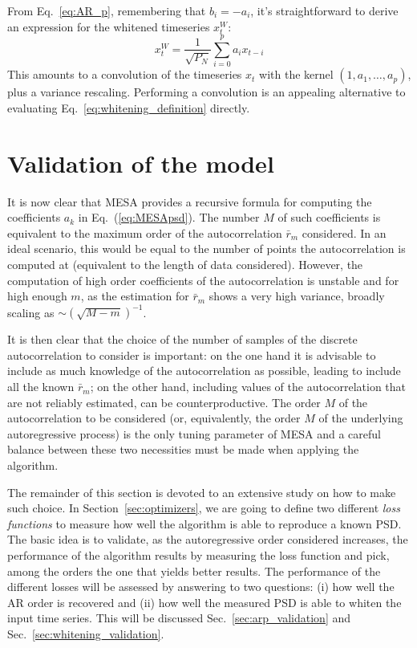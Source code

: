 \documentclass{aa}
\begin{document}
From Eq.~\eqref{eq:AR_p}, remembering that $b_i = - a_i$, it's straightforward to derive an expression for the whitened timeseries $x^W_t$:
\begin{equation}
	x^W_t = \frac{1}{\sqrt{P_N}} \sum_{i=0}^p a_i x_{t-i}
\end{equation}
This amounts to a convolution of the timeseries  $x_t$ with the kernel $(1, a_1, \hdots, a_p)$, plus a variance rescaling.
Performing a convolution is an appealing alternative to evaluating Eq.~\eqref{eq:whitening_definition} directly.

\section{Validation of the model}\label{sec:validation}
It is now clear that MESA provides a recursive formula for computing the coefficients $a_k$ in Eq.~(\ref{eq:MESApsd}). The number $M$ of such coefficients is equivalent to the maximum order of the autocorrelation $\bar{r}_m$ considered. In an ideal scenario, this would be equal to the number of points the autocorrelation is computed at (equivalent to the length of data considered). However, the computation of high order coefficients of the autocorrelation is unstable and for high enough $m$, as the estimation for  $\bar{r}_m$ shows a very high variance, broadly scaling as $\sim \left(\sqrt{M - m}\right)^{-1}$.

It is then clear that the choice of the number of samples of the discrete autocorrelation to consider is important: 
on the one hand it is advisable to include as much knowledge of the autocorrelation as possible, leading to include all the known $\bar{r}_m$; on the other hand, including values of the autocorrelation that are not reliably estimated, can be counterproductive.
The order $M$ of the autocorrelation to be considered (or, equivalently, the order $M$ of the underlying autoregressive process) is the only tuning parameter of MESA and a careful balance between these two necessities must be made when applying the algorithm.

The remainder of this section is devoted to an extensive study on how to make such choice.
In Section~\ref{sec:optimizers}, we are going to define two different \textit{loss functions} to measure how well the 
algorithm is able to reproduce a known PSD.
The basic idea is to validate, as the autoregressive order considered increases, the performance of the algorithm results 
by measuring the loss function and pick, among the orders the one that yields better results.
The performance of the different losses will be assessed by answering to two questions: (i) how well the AR order is recovered and (ii) how well the measured PSD is able to whiten the input time series.
This will be discussed Sec.~\ref{sec:arp_validation} and Sec.~\ref{sec:whitening_validation}.
\end{document}

